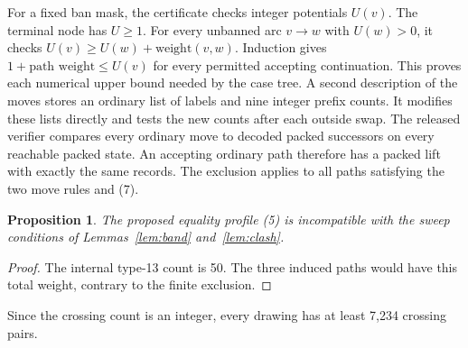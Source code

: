 \documentclass[11pt]{article}
\newtheorem{proposition}[theorem]{Proposition}
\begin{document}
For a fixed ban mask, the certificate checks integer potentials \(U(v)\). The terminal node has \(U\ge1\). For every unbanned arc \(v\to w\) with \(U(w)>0\), it checks \(U(v)\ge U(w)+\text{weight}(v,w)\). Induction gives \(1+\text{path weight}\le U(v)\) for every permitted accepting continuation. This proves each numerical upper bound needed by the case tree. A second description of the moves stores an ordinary list of labels and nine integer prefix counts. It modifies these lists directly and tests the new counts after each outside swap. The released verifier compares every ordinary move to decoded packed successors on every reachable packed state. An accepting ordinary path therefore has a packed lift with exactly the same records. The exclusion applies to all paths satisfying the two move rules and (7).

\begin{proposition}
The proposed equality profile (5) is incompatible with the sweep conditions of Lemmas~\ref{lem:band} and~\ref{lem:clash}.
\end{proposition}
\begin{proof}
The internal type-13 count is 50. The three induced paths would have this total weight, contrary to the finite exclusion.
\end{proof}
Since the crossing count is an integer, every drawing has at least 7,234 crossing pairs.
\end{document}
